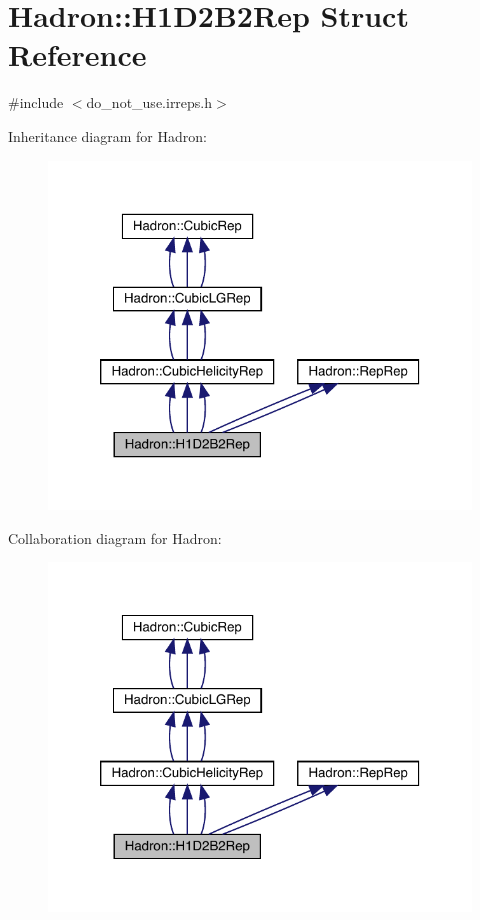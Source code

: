 \hypertarget{structHadron_1_1H1D2B2Rep}{}\section{Hadron\+:\+:H1\+D2\+B2\+Rep Struct Reference}
\label{structHadron_1_1H1D2B2Rep}


{\ttfamily \#include $<$do\+\_\+not\+\_\+use.\+irreps.\+h$>$}



Inheritance diagram for Hadron\+:
\nopagebreak
\begin{figure}[H]
\begin{center}
\leavevmode
\includegraphics[width=320pt]{df/d11/structHadron_1_1H1D2B2Rep__inherit__graph}
\end{center}
\end{figure}


Collaboration diagram for Hadron\+:
\nopagebreak
\begin{figure}[H]
\begin{center}
\leavevmode
\includegraphics[width=320pt]{d8/dd7/structHadron_1_1H1D2B2Rep__coll__graph}
\end{center}
\end{figure}
